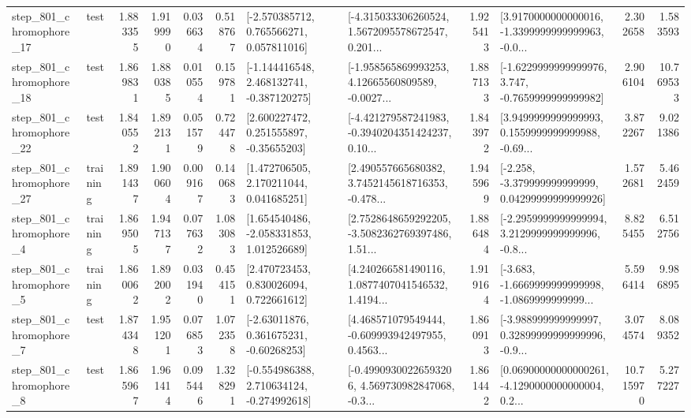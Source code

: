 \begin{tabular}{llrrrrllrlrr}
  step\_801\_chromophore\_17 &      test &      1.883355 &    1.919990 &      0.036634 &  0.518767 &    [-2.570385712, 0.765566271, 0.057811016] &  [-4.315033306260524, 1.5672095578672547, 0.201... &       1.925413 &  [3.9170000000000016, -1.3399999999999963, -0.0... &            2.302658 &          1.583593 \\
  step\_801\_chromophore\_18 &      test &      1.869831 &    1.880385 &      0.010554 &  0.159781 &   [-1.144416548, 2.468132741, -0.387120275] &  [-1.958565869993253, 4.12665560809589, -0.0027... &       1.887133 &  [-1.6229999999999976, 3.747, -0.7659999999999982] &            2.906104 &         10.769533 \\
  step\_801\_chromophore\_22 &      test &      1.840552 &    1.892131 &      0.051579 &  0.724478 &     [2.600227472, 0.251555897, -0.35655203] &  [-4.421279587241983, -0.3940204351424237, 0.10... &       1.843972 &  [3.9499999999999993, 0.1559999999999988, -0.69... &            3.872267 &          9.021386 \\
  step\_801\_chromophore\_27 &  training &      1.891437 &    1.900604 &      0.009167 &  0.140683 &     [1.472706505, 2.170211044, 0.041685251] &  [2.490557665680382, 3.7452145618716353, -0.478... &       1.945969 &  [-2.258, -3.379999999999999, 0.04299999999999926] &            1.572681 &          5.462459 \\
   step\_801\_chromophore\_4 &  training &      1.869505 &    1.947137 &      0.077632 &  1.083083 &    [1.654540486, -2.058331853, 1.012526689] &  [2.7528648659292205, -3.5082362769397486, 1.51... &       1.886484 &  [-2.2959999999999994, 3.2129999999999996, -0.8... &            8.825455 &          6.512756 \\
   step\_801\_chromophore\_5 &  training &      1.860062 &    1.892002 &      0.031940 &  0.454151 &     [2.470723453, 0.830026094, 0.722661612] &  [4.240266581490116, 1.0877407041546532, 1.4194... &       1.919164 &  [-3.683, -1.6669999999999998, -1.0869999999999... &            5.596414 &          9.986895 \\
   step\_801\_chromophore\_7 &      test &      1.874348 &    1.951201 &      0.076853 &  1.072358 &     [-2.63011876, 0.361675231, -0.60268253] &  [4.468571079549444, -0.609993942497955, 0.4563... &       1.860913 &  [-3.988999999999997, 0.32899999999999996, -0.9... &            3.074574 &          8.089352 \\
   step\_801\_chromophore\_8 &      test &      1.865967 &    1.961414 &      0.095446 &  1.328291 &   [-0.554986388, 2.710634124, -0.274992618] &  [-0.49909300226593206, 4.569730982847068, -0.3... &       1.861442 &  [0.06900000000000261, -4.1290000000000004, 0.2... &           10.715970 &          5.277227 \\

\end{tabular}
